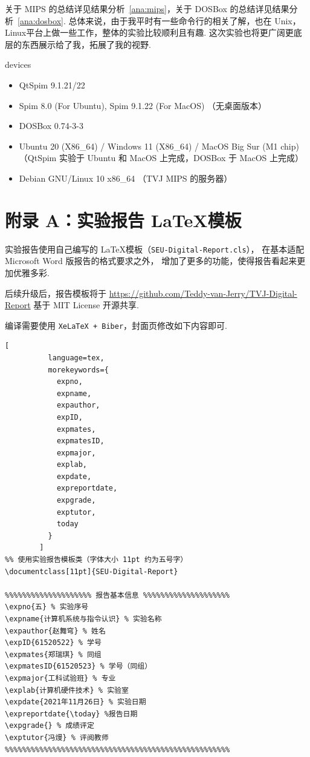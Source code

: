 \documentclass[11pt]{SEU-Digital-Report}
\begin{document}
    关于 MIPS 的总结详见结果分析~\ref{ana:mips}，关于 DOSBox 的总结详见结果分析~\ref{ana:dosbox}.
    总体来说，由于我平时有一些命令行的相关了解，也在 Unix，Linux平台上做一些工作，整体的实验比较顺利且有趣.
    这次实验也将更广阔更底层的东西展示给了我，拓展了我的视野.

    \begin{device}{}{devices}
      \begin{itemize}
        \item QtSpim 9.1.21/22
        \item Spim 8.0 (For Ubuntu), Spim 9.1.22 (For MacOS) {\kaishu\color{gray}（无桌面版本）}
        \item DOSBox 0.74-3-3
        \item Ubuntu 20 (X86\_64) / Windows 11 (X86\_64) / MacOS Big Sur (M1 chip){\kaishu\color{gray}（QtSpim 实验于 Ubuntu 和 MacOS 上完成，DOSBox 于 MacOS 上完成）}
        \item Debian GNU/Linux 10 x86\_64 {\kaishu\color{gray}（TVJ MIPS 的服务器）}
      \end{itemize}
    \end{device}
    

    \printbibliography[sorting=none]

    \section*{附录 A：实验报告 \LaTeX 模板}

        实验报告使用自己编写的 \LaTeX 模板（\texttt{SEU-Digital-Report.cls}），
        在基本适配 Microsoft Word 版报告的格式要求之外，
        增加了更多的功能，使得报告看起来更加优雅多彩.

        后续升级后，报告模板将于 \url{https://github.com/Teddy-van-Jerry/TVJ-Digital-Report} 基于 MIT License 开源共享.

        编译需要使用 \texttt{XeLaTeX + Biber}，封面页修改如下内容即可.
        \begin{lstlisting}[
          language=tex,
          morekeywords={
            expno,
            expname,
            expauthor,
            expID,
            expmates,
            expmatesID,
            expmajor,
            explab,
            expdate,
            expreportdate,
            expgrade,
            exptutor,
            today
          }
        ]
%% 使用实验报告模板类（字体大小 11pt 约为五号字）
\documentclass[11pt]{SEU-Digital-Report}

%%%%%%%%%%%%%%%%%%%% 报告基本信息 %%%%%%%%%%%%%%%%%%%%
\expno{五} % 实验序号
\expname{计算机系统与指令认识} % 实验名称
\expauthor{赵舞穹} % 姓名
\expID{61520522} % 学号
\expmates{郑瑞琪} % 同组
\expmatesID{61520523} % 学号（同组）
\expmajor{工科试验班} % 专业
\explab{计算机硬件技术} % 实验室
\expdate{2021年11月26日} % 实验日期
\expreportdate{\today} %报告日期
\expgrade{} % 成绩评定
\exptutor{冯熳} % 评阅教师
%%%%%%%%%%%%%%%%%%%%%%%%%%%%%%%%%%%%%%%%%%%%%%%%%%%%
        \end{lstlisting}
\end{document}

